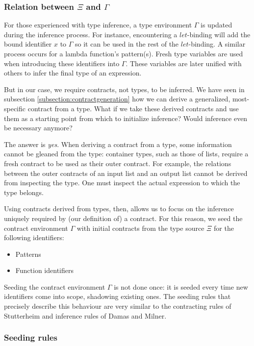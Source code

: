 \documentclass[10pt]{report}
\begin{document}
\subsubsection{Relation between $\Xi$ and $\Gamma$}

For those experienced with type inference, a type environment $\Gamma$ is updated during the inference process.
For instance, encountering a $let$-binding will add the bound identifier $x$ to $\Gamma$ so it can be used in the rest of the $let$-binding.
A similar process occurs for a lambda function's pattern(s).
Fresh type variables are used when introducing these identifiers into $\Gamma$.
These variables are later unified with others to infer the final type of an expression.

But in our case, we require contracts, not types, to be inferred.
We have seen in subsection \ref{subsection:contractgeneration} how we can derive a generalized, most-specific contract from a type.
What if we take these derived contracts and use them as a starting point from which to initialize inference?
Would inference even be necessary anymore?

The answer is \textit{yes}.
When deriving a contract from a type, some information cannot be gleaned from the type: container types, such as those of lists, require a fresh contract to be used as their outer contract.
For example, the relations between the outer contracts of an input list and an output list cannot be derived from inspecting the type.
One must inspect the actual expression to which the type belongs.

Using contracts derived from types, then, allows us to focus on the inference uniquely required by (our definition of) a contract.
For this reason, we seed the contract environment $\Gamma$ with initial contracts from the type source $\Xi$ for the following identifiers:

\begin{itemize}
	\item Patterns
	\item Function identifiers
\end{itemize}

Seeding the contract environment $\Gamma$ is not done once: it is seeded every time new identifiers come into scope, shadowing existing ones.
The seeding rules that precisely describe this behaviour are very similar to the contracting rules of Stutterheim and inference rules of Damas and Milner.

\subsubsection{Seeding rules}
\end{document}
